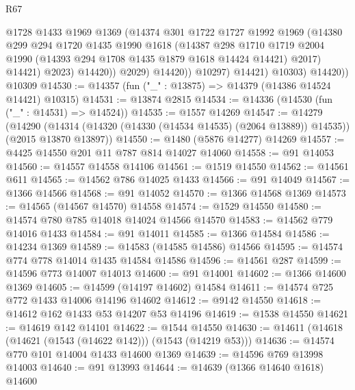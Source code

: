 \begin{lexlean}{R67}
\begin{coremodule}
                        @1728
                        @1433
                        @1969
                        @1369
                        (@14374
                          @301
                          @1722
                          @1727
                          @1992
                          @1969
                          (@14380
                            @299
                            @294
                            @1720
                            @1435
                            @1990
                            @1618
                            (@14387
                              @298
                              @1710
                              @1719
                              @2004
                              @1990
                              (@14393 @294 @1708 @1435 @1879 @1618 @14424 @14421)
                              @2017)
                            @14421)
                          @2023)
                        @14420))
                    @2029)
                  @14420))
              @10297)
            @14421)
          @10303)
        @14420))
    @10309
@14530 := @14357 (fun ("_" : @13875) => @14379 (@14386 @14524 @14421) @10315)
@14531 := @13874 @2815
@14534 := @14336 (@14530 (fun ("_" : @14531) => @14524))
@14535 := @1557 @14269
@14547 := @14279
    (@14290 (@14314 (@14320 (@14330 (@14534 @14535) (@2064 @13889)) @14535)) (@2015 @13870 @13897))
@14550 := @1480 (@5876 @14277) @14269
@14557 := @4425 @14550 @201 @11 @787 @814 @14027 @14060
@14558 := @91 @14053
@14560 := @14557 @14558 @14106
@14561 := @1519 @14550
@14562 := @14561 @611
@14565 := @14562 @786 @14025 @1433
@14566 := @91 @14049
@14567 := @1366 @14566
@14568 := @91 @14052
@14570 := @1366 @14568 @1369
@14573 := @14565 (@14567 @14570) @14558
@14574 := @1529 @14550
@14580 := @14574 @780 @785 @14018 @14024 @14566 @14570
@14583 := @14562 @779 @14016 @1433
@14584 := @91 @14011
@14585 := @1366 @14584
@14586 := @14234 @1369
@14589 := @14583 (@14585 @14586) @14566
@14595 := @14574 @774 @778 @14014 @1435 @14584 @14586
@14596 := @14561 @287
@14599 := @14596 @773 @14007 @14013
@14600 := @91 @14001
@14602 := @1366 @14600 @1369
@14605 := @14599 (@14197 @14602) @14584
@14611 := @14574 @725 @772 @1433 @14006 @14196 @14602
@14612 := @9142 @14550
@14618 := @14612 @162 @1433 @53 @14207 @53 @14196
@14619 := @1538 @14550
@14621 := @14619 @142 @14101
@14622 := @1544 @14550
@14630 := @14611 (@14618 (@14621 (@1543 (@14622 @142))) (@1543 (@14219 @53)))
@14636 := @14574 @770 @101 @14004 @1433 @14600 @1369
@14639 := @14596 @769 @13998 @14003
@14640 := @91 @13993
@14644 := @14639 (@1366 @14640 @1618) @14600

\end{coremodule}
\end{lexlean}

